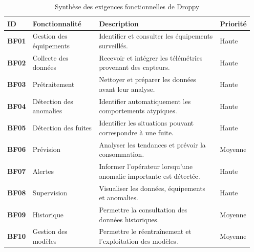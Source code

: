 \begin{table}[H]
\centering
\caption{Synthèse des exigences fonctionnelles de Droppy}
\label{tab:exigences-droppy}

\renewcommand{\arraystretch}{1.35}

\begin{tabularx}{\textwidth}{
    >{\bfseries\centering\arraybackslash}p{1.5cm}
    >{\raggedright\arraybackslash}p{3.1cm}
    >{\raggedright\arraybackslash}X
    >{\centering\arraybackslash}p{1.8cm}
}

\toprule

ID & Fonctionnalité & Description & Priorité \\

\midrule

BF01 &
Gestion des équipements &
Identifier et consulter les équipements surveillés. &
Haute \\

BF02 &
Collecte des données &
Recevoir et intégrer les télémétries provenant des capteurs. &
Haute \\

BF03 &
Prétraitement &
Nettoyer et préparer les données avant leur analyse. &
Haute \\

BF04 &
Détection des anomalies &
Identifier automatiquement les comportements atypiques. &
Haute \\

BF05 &
Détection des fuites &
Identifier les situations pouvant correspondre à une fuite. &
Haute \\

BF06 &
Prévision &
Analyser les tendances et prévoir la consommation. &
Moyenne \\

BF07 &
Alertes &
Informer l'opérateur lorsqu'une anomalie importante est détectée. &
Haute \\

BF08 &
Supervision &
Visualiser les données, équipements et anomalies. &
Haute \\

BF09 &
Historique &
Permettre la consultation des données historiques. &
Moyenne \\

BF10 &
Gestion des modèles &
Permettre le réentraînement et l'exploitation des modèles. &
Moyenne \\

\bottomrule

\end{tabularx}

\end{table}

